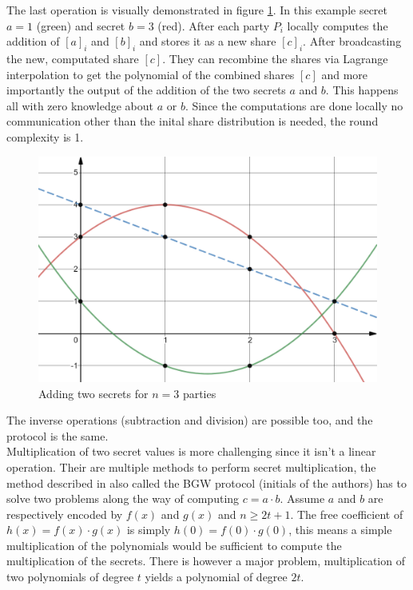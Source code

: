 The last operation is visually demonstrated in figure \ref{fig:addsecrets}. In this example secret $a=1$ (green) and secret $b=3$ (red). After each party $P_i$ locally computes the addition of $[a]_i$ and $[b]_i$ and stores it as a new share $[c]_i$. After broadcasting the new, computated share $[c]$. They can recombine the shares via Lagrange interpolation to get the polynomial of the combined shares $[c]$ and more importantly the output of the addition of the two secrets $a$ and $b$. This happens all with zero knowledge about $a$ or $b$. Since the computations are done locally no communication other than the inital share distribution is needed, the round complexity is 1.

\begin{figure}
  \includegraphics[width=\linewidth]{plots/addsecrets.png}
  \caption{Adding two secrets for $n=3$ parties}
  \label{fig:addsecrets}
\end{figure}

The inverse operations (subtraction and division) are possible too, and the protocol is the same.\\
Multiplication of two secret values is more challenging since it isn't a linear operation. Their are multiple methods to perform secret multiplication, the method described in \cite{ben1988completeness} also called the BGW protocol (initials of the authors) has to solve two problems along the way of computing $c = a \cdot b$. Assume $a$ and $b$ are respectively encoded by $f(x)$ and $g(x)$ and $n \geq 2t + 1$. The free coefficient of $h(x) = f(x) \cdot g(x)$ is simply $h(0) = f(0) \cdot g(0)$, this means a simple multiplication of the polynomials would be sufficient to compute the multiplication of the secrets. There is however a major problem, multiplication of two polynomials of degree $t$ yields a polynomial of degree $2t$.

